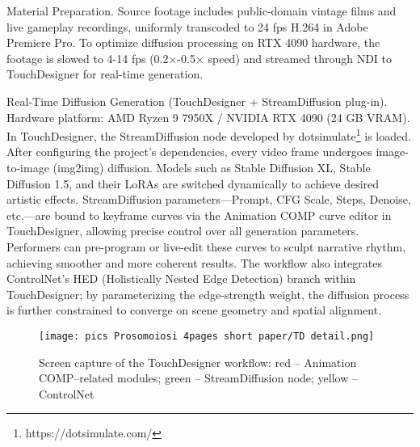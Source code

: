 \documentclass[sigconf,nonacm]{acmart}
\begin{document}
{Material Preparation.}
Source footage includes public-domain vintage films and live gameplay recordings, uniformly transcoded to 24 fps H.264 in Adobe Premiere Pro. To optimize diffusion processing on RTX 4090 hardware, the footage is slowed to 4-14 fps (0.2×-0.5× speed) and streamed through NDI to TouchDesigner for real-time generation.

{Real-Time Diffusion Generation (TouchDesigner + StreamDiffusion plug-in).}
Hardware platform: AMD Ryzen 9 7950X / NVIDIA RTX 4090 (24 GB VRAM).
In TouchDesigner, the StreamDiffusion node developed by dotsimulate\footnote{https://dotsimulate.com/} is loaded. After configuring the project's dependencies, every video frame undergoes image-to-image (img2img) diffusion. Models such as Stable Diffusion XL, Stable Diffusion 1.5, and their LoRAs are switched dynamically to achieve desired artistic effects.
StreamDiffusion parameters—Prompt, CFG Scale, Steps, Denoise, etc.—are bound to keyframe curves via the Animation COMP curve editor in TouchDesigner, allowing precise control over all generation parameters. Performers can pre-program or live-edit these curves to sculpt narrative rhythm, achieving smoother and more coherent results.
The workflow also integrates ControlNet's HED (Holistically Nested Edge Detection) branch within TouchDesigner; by parameterizing the edge-strength weight, the diffusion process is further constrained to converge on scene geometry and spatial alignment.
\begin{figure}[H]
    \centering
    \texttt{[image: pics Prosomoiosi 4pages short paper/TD detail.png]}
    \caption{Screen capture of the TouchDesigner workflow: red – Animation COMP–related modules; green – StreamDiffusion node; yellow – ControlNet}
    \label{fig:enter-label}
\end{figure}
\end{document}
